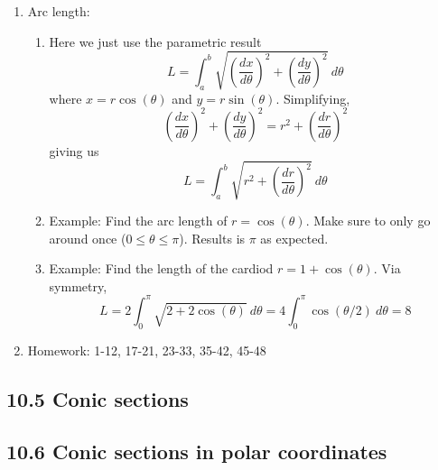 \documentclass{article}
\begin{document}
\begin{enumerate}
\item Arc length: 
\begin{enumerate}
\item Here we just use the parametric result
\[
L = \int_a^b \sqrt{\left(\frac{dx}{d\theta}\right)^2+ \left(\frac{dy}{d\theta}\right)^2 }~d\theta
\]
where $x=r\cos(\theta)$ and $y=r\sin(\theta)$. Simplifying,
\[
\left(\frac{dx}{d\theta}\right)^2+ \left(\frac{dy}{d\theta}\right)^2 = r^2 + \left(\frac{dr}{d\theta}\right)^2
\]
giving us
\[
L = \int_a^b \sqrt{r^2 + \left(\frac{dr}{d\theta}\right)^2 }~d\theta
\]
\item Example: Find the arc length of $r=\cos(\theta)$. Make sure to only go around once ($0 \leq \theta \leq \pi$). Results is $\pi$ as expected.
\item Example: Find the length of the cardiod $r=1+\cos(\theta)$. Via symmetry,
\[
L = 2\int_0^{\pi} \sqrt{2+2\cos(\theta)}~d\theta = 4\int_0^{\pi} \cos(\theta/2)~d\theta = 8
\]
\end{enumerate}

\item Homework: 1-12, 17-21, 23-33, 35-42, 45-48
\end{enumerate}

\subsection{10.5 Conic sections}

\subsection{10.6 Conic sections in polar coordinates}



\end{document}
